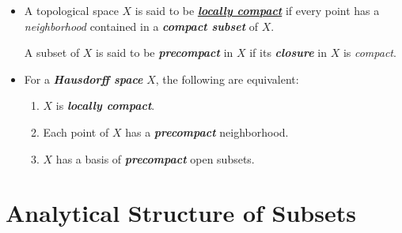 \documentclass[11pt]{article}
\begin{document}
\begin{itemize}
\item \begin{definition}
A topological space $X$ is said to be \underline{\emph{\textbf{locally compact}}} if every point has a \emph{neighborhood} contained in a \emph{\textbf{compact subset}} of $X$. 

A subset of $X$ is said to be \emph{\textbf{precompact}} in $X$ if its \emph{\textbf{closure}} in $X$ is \emph{compact}.
\end{definition}


\item For a \emph{\textbf{Hausdorff space}} $X$,  the following are equivalent:
\begin{enumerate}
\item $X$ is \emph{\textbf{locally compact}}.
\item Each point of $X$ has a \emph{\textbf{precompact}} neighborhood. 
\item $X$ has a basis of \emph{\textbf{precompact}} open subsets.
\end{enumerate}
\end{itemize}
\newpage
\section{Analytical Structure of Subsets}
\end{document}
